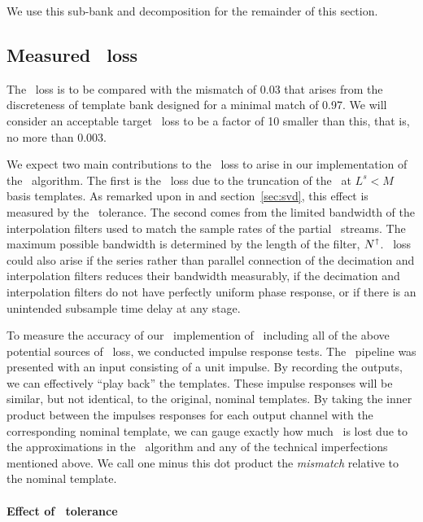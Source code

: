 We use this sub-bank and decomposition for the remainder of this section.

\subsection{Measured \SNR\ loss}

The \SNR\ loss is to be compared with the mismatch of 0.03 that arises from the
discreteness of template bank designed for a minimal match of 0.97.  We will consider
an acceptable target \SNR\ loss to be a factor of 10 smaller than this, that is, no more
than 0.003.

We expect two main contributions to the \SNR\ loss to arise in our
implementation of the \lloid\ algorithm.  The first is the \SNR\ loss due to
the truncation of the \SVD\ at $L^s < M$ basis templates.  As remarked upon in
\citet{Cannon:2010p10398} and section~\ref{sec:svd}, this effect is measured by
the \SVD\ tolerance.  The second comes from the limited bandwidth of the
interpolation filters used to match the sample rates of the partial \SNR\ streams.
The maximum possible bandwidth is determined by the length of the filter,
$N^\shortuparrow$.  \SNR\ loss could also arise if the series rather than parallel
connection of the decimation and interpolation filters reduces their bandwidth
measurably, if the decimation and interpolation filters do not have perfectly uniform
phase response, or if there is an unintended subsample time delay at any stage.

To measure the accuracy of our \gstreamer\ implemention of \lloid\ including all of
the above potential sources of \SNR\ loss, we conducted impulse response tests.  The
\gstreamer\ pipeline was presented with an input consisting of a unit impulse.  By
recording the outputs, we can effectively ``play back'' the templates.  These impulse
responses will be similar, but not identical, to the original, nominal templates.  By
taking the inner product between the impulses responses for each output 
channel with the corresponding nominal template, we can gauge exactly how much \SNR\
is lost due to the approximations in the \lloid\ algorithm and any of the technical
imperfections mentioned above.  We call one minus this dot product the \emph{mismatch}
relative to the nominal template.

\paragraph{Effect of \SVD\ tolerance}

